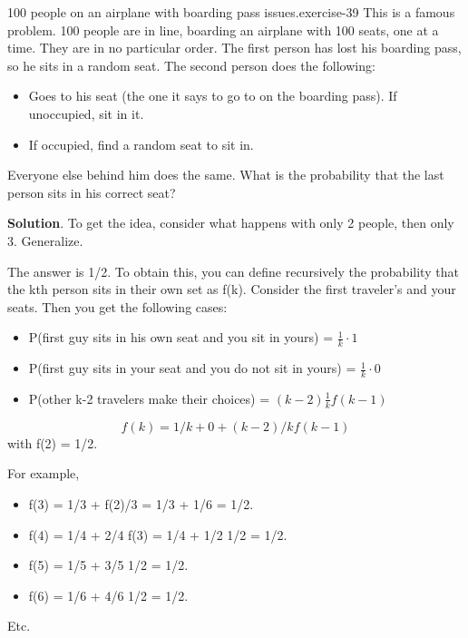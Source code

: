 \documentclass[10pt,]{book}
\numberwithin{equation}{section}
\begin{document}
\begin{inlineexercise}{100 people on an airplane with boarding pass issues.}{exercise-39}%
\hypertarget{p-623}{}%
This is a famous problem.  100 people are in line, boarding an airplane with 100 seats, one at a time. They are in no particular order. The first person has lost his boarding pass, so he sits in a random seat. The second person does the following: \leavevmode%
\begin{itemize}[label=\textbullet]
\item{}Goes to his seat (the one it says to go to on the boarding pass). If unoccupied, sit in it.%
\item{}If occupied, find a random seat to sit in.%
\end{itemize}
 Everyone else behind him does the same. What is the probability that the last person sits in his correct seat?%
\par\smallskip%
\noindent\textbf{Solution}.\hypertarget{solution-17}{}\quad%
\hypertarget{p-624}{}%
To get the idea, consider what happens with only 2 people, then only 3. Generalize.%
\par
\hypertarget{p-625}{}%
The answer is 1/2. To obtain this, you can define recursively the probability that the kth person sits in their own set as f(k).  Consider the first traveler's and your seats. Then you get the following cases: \leavevmode%
\begin{itemize}[label=\textbullet]
\item{}P(first guy sits in his own seat and you sit in yours) = \(\frac{1}{k} \cdot 1\)%
\item{}P(first guy sits in your seat and you do not sit in yours) = \(\frac{1}{k} \cdot 0\)%
\item{}P(other k-2 travelers make their choices) = \((k-2) \frac{1}{k} f(k-1)\)%
\end{itemize}
%
\begin{equation*}
f(k) = 1/k + 0 + (k-2)/k f(k-1)
\end{equation*}
with f(2) = 1/2.%
\par
\hypertarget{p-626}{}%
For example, \leavevmode%
\begin{itemize}[label=\textbullet]
\item{}f(3) = 1/3 + f(2)/3 = 1/3 + 1/6 = 1/2.%
\item{}f(4) = 1/4 + 2/4 f(3) = 1/4 + 1/2 1/2 = 1/2.%
\item{}f(5) = 1/5 + 3/5 1/2 = 1/2.%
\item{}f(6) = 1/6 + 4/6 1/2 = 1/2.%
\end{itemize}
 Etc.%
\end{inlineexercise}
\end{document}
